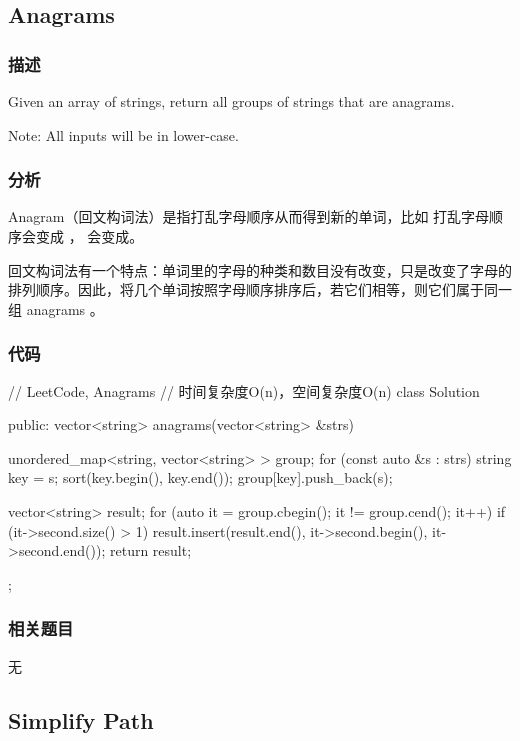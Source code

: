 \subsection{Anagrams} %
\label{sec:anagrams}


\subsubsection{描述}
Given an array of strings, return all groups of strings that are anagrams.

Note: All inputs will be in lower-case.


\subsubsection{分析}
Anagram（回文构词法）是指打乱字母顺序从而得到新的单词，比如  打乱字母顺序会变成  ， 会变成。

回文构词法有一个特点：单词里的字母的种类和数目没有改变，只是改变了字母的排列顺序。因此，将几个单词按照字母顺序排序后，若它们相等，则它们属于同一组 anagrams 。


\subsubsection{代码}
\begin{Code}
	// LeetCode, Anagrams
	// 时间复杂度O(n)，空间复杂度O(n)
	class Solution {
		public:
		vector<string> anagrams(vector<string> &strs) {
			unordered_map<string, vector<string> > group;
			for (const auto &s : strs) {
				string key = s;
				sort(key.begin(), key.end());
				group[key].push_back(s);
			}
			
			vector<string> result;
			for (auto it = group.cbegin(); it != group.cend(); it++) {
				if (it->second.size() > 1)
				result.insert(result.end(), it->second.begin(), it->second.end());
			}
			return result;
		}
	};
\end{Code}


\subsubsection{相关题目}
\begindot
\item 无
\myenddot


\subsection{Simplify Path} %
\label{sec:simplify-path}


